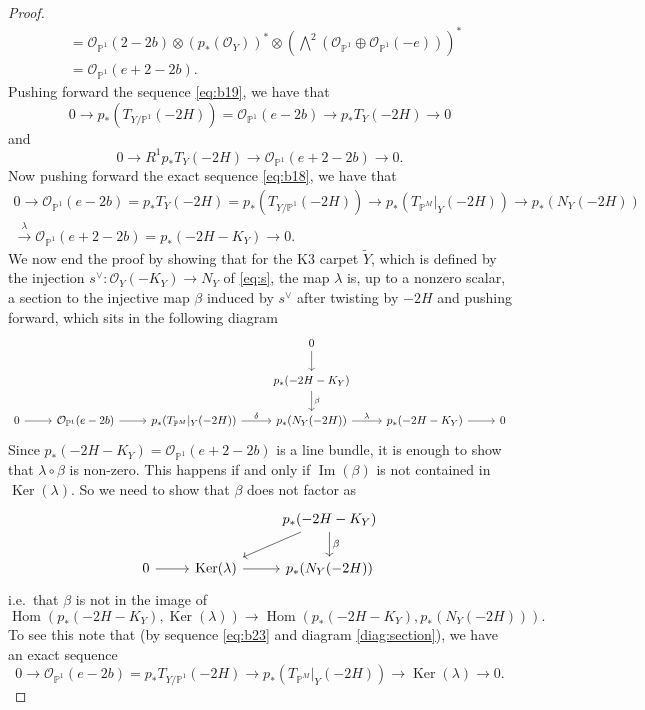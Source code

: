 \documentclass[11pt,twoside]{amsart}
\theoremstyle{plain}
\theoremstyle{definition}
\newcommand{\PP}{\mathbb{P}}
\newcommand{\PM}{\mathbb{P}^M}
\newcommand{\OO}{\mathcal{O}}
\newcommand{\Hom}{\operatorname{Hom}}
\newcommand{\Yt}{\widetilde{Y}}
\newcommand{\NY}{N_{Y}}
\newcommand{\TP}{T_{\PM}|_Y}
\begin{document}
\begin{proof}
\begin{align*}
&=\OO_{\PP^1}(2-2b)\otimes(p_*(\OO_Y))^*\otimes(\textstyle\bigwedge^2(\OO_{\PP^1}\oplus\OO_{\PP^1}(-e)))^*\\
&=\OO_{\PP^1}(e+2-2b) .
\end{align*}
Pushing forward the sequence \eqref{eq:b19}, we have that
\[
0\to p_*(T_{Y/\PP^1}(-2H))=\OO_{\PP^1}(e-2b)\to p_*T_Y(-2H)\to0
\]
and
\[
0\to R^1p_*T_Y(-2H)\to\OO_{\PP^1}(e+2-2b)\to0 .
\]
Now pushing forward the exact sequence \eqref{eq:b18}, we have that
\begin{multline}\label{eq:b23}
0\to\OO_{\PP^1}(e-2b)=p_*T_Y(-2H)=p_*(T_{Y/\PP^1}(-2H))\to p_*(\TP(-2H))\to p_*(\NY(-2H))\\
\xrightarrow{\ \lambda\ }\OO_{\PP^1}(e+2-2b)=p_*(-2H-K_Y)\to0 .
\end{multline}
We now end the proof by showing that for the K3 carpet $\Yt$, which is defined by the injection $s^{\vee}\colon\OO_Y(-K_Y)\to\NY$ of \eqref{eq:s}, the map $\lambda$ is, up to a nonzero scalar, a section to the injective map $\beta$ induced by $s^{\vee}$ after twisting by $-2H$ and pushing forward, which sits in the following diagram
\begin{equation}\label{diag:section}
\begin{tikzcd}
  &&& 0 \arrow[d] && \\
  &&& p_*(-2H-K_Y) \arrow[d, "\beta"] && \\
  0 \arrow[r] & \OO_{\PP^1}(e-2b) \arrow[r] &  p_*(\TP(-2H)) \arrow[r, "\delta"] & p_*(\NY(-2H)) \arrow[r, "\lambda"] & p_*(-2H-K_Y) \arrow[r] & 0
\end{tikzcd}
\end{equation}
Since $p_*(-2H-K_Y)=\OO_{\PP^1}(e+2-2b)$ is a line bundle, it is enough to show that $\lambda\circ\beta$ is non-zero. This happens if and only if $\operatorname{Im}(\beta)$ is not contained in $\operatorname{Ker}(\lambda)$. So we need to show that $\beta$ does not factor as
\[
\begin{tikzcd}
   & & p_*(-2H-K_Y) \arrow[d, "\beta"] \arrow[dl] \\
   0 \arrow[r] & \operatorname{Ker}(\lambda) \arrow[r] & p_*(\NY(-2H))
\end{tikzcd}
\]
i.e.\ that $\beta$ is not in the image of
\begin{equation}\label{eq:b32}
\Hom(p_*(-2H-K_Y),\operatorname{Ker}(\lambda))\to\Hom(p_*(-2H-K_Y),p_*(\NY(-2H))) .
\end{equation}
To see this note that (by sequence \eqref{eq:b23} and diagram \eqref{diag:section}), we have an exact sequence
\[
0\to\OO_{\PP^1}(e-2b)=p_*T_{Y/\PP^1}(-2H)\to p_*(\TP(-2H))\to\operatorname{Ker}(\lambda)\to0 .
\]
\end{proof}
\end{document}
